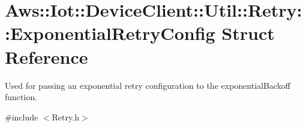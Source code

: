 \hypertarget{struct_aws_1_1_iot_1_1_device_client_1_1_util_1_1_retry_1_1_exponential_retry_config}{}\section{Aws\+:\+:Iot\+:\+:Device\+Client\+:\+:Util\+:\+:Retry\+:\+:Exponential\+Retry\+Config Struct Reference}
\label{struct_aws_1_1_iot_1_1_device_client_1_1_util_1_1_retry_1_1_exponential_retry_config}


Used for passing an exponential retry configuration to the exponential\+Backoff function.  




{\ttfamily \#include $<$Retry.\+h$>$}

